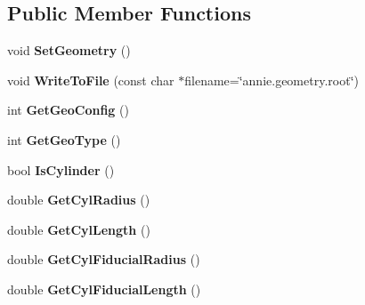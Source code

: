 \subsection*{Public Member Functions}
\begin{DoxyCompactItemize}
\item 
\hypertarget{classANNIEGeometry_a143bd07247da431b54d152fa7cb5c7cf}{void {\bfseries Set\-Geometry} ()}\label{classANNIEGeometry_a143bd07247da431b54d152fa7cb5c7cf}

\item 
\hypertarget{classANNIEGeometry_ab765a9957be6e19208c25fa0e6603ab7}{void {\bfseries Write\-To\-File} (const char $\ast$filename=\char`\"{}annie.\-geometry.\-root\char`\"{})}\label{classANNIEGeometry_ab765a9957be6e19208c25fa0e6603ab7}

\item 
\hypertarget{classANNIEGeometry_a4a2b51837cbc2b52159fde213624f07b}{int {\bfseries Get\-Geo\-Config} ()}\label{classANNIEGeometry_a4a2b51837cbc2b52159fde213624f07b}

\item 
\hypertarget{classANNIEGeometry_a181399c8d8d8e1e7deaf5e26fc19f6a2}{int {\bfseries Get\-Geo\-Type} ()}\label{classANNIEGeometry_a181399c8d8d8e1e7deaf5e26fc19f6a2}

\item 
\hypertarget{classANNIEGeometry_af52285d65bb359e199d5516215e9d4b2}{bool {\bfseries Is\-Cylinder} ()}\label{classANNIEGeometry_af52285d65bb359e199d5516215e9d4b2}

\item 
\hypertarget{classANNIEGeometry_af4067a89f27815d2be201734cf88ef66}{double {\bfseries Get\-Cyl\-Radius} ()}\label{classANNIEGeometry_af4067a89f27815d2be201734cf88ef66}

\item 
\hypertarget{classANNIEGeometry_aeb5d59529df45997aa9e88d439fefbba}{double {\bfseries Get\-Cyl\-Length} ()}\label{classANNIEGeometry_aeb5d59529df45997aa9e88d439fefbba}

\item 
\hypertarget{classANNIEGeometry_a3dce208ec7515a6db41b29a222ef7a4c}{double {\bfseries Get\-Cyl\-Fiducial\-Radius} ()}\label{classANNIEGeometry_a3dce208ec7515a6db41b29a222ef7a4c}

\item 
\hypertarget{classANNIEGeometry_adda169892f173736e7873a0994fa37b6}{double {\bfseries Get\-Cyl\-Fiducial\-Length} ()}\label{classANNIEGeometry_adda169892f173736e7873a0994fa37b6}


\end{DoxyCompactItemize}
